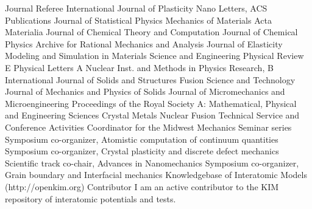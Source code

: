 \documentclass[numbers]{cv}
\begin{document}
\begin{service}
     \serviceitem
        {Journal Referee}
        {
          \eventitem{} {International Journal of Plasticity } {}
          \eventitem{} {Nano Letters, ACS Publications } {}
          \eventitem{} {Journal of Statistical Physics } {}
          \eventitem{} {Mechanics of Materials } {}
          \eventitem{} {Acta Materialia } {}
          \eventitem{} {Journal of Chemical Theory and Computation } {}
          \eventitem{} {Journal of Chemical Physics } {}
          \eventitem{} {Archive for Rational Mechanics and Analysis } {}
          \eventitem{} {Journal of Elasticity } {}
          \eventitem{} {Modeling and Simulation in Materials Science and Engineering }{}
          \eventitem{} {Physical Review E }{}
          \eventitem{} {Physical Letters A }{}
          \eventitem{} {Nuclear Inst. and Methods in Physics Research, B }{}
          \eventitem{} {International Journal of Solids and Structures } {}
          \eventitem{} {Fusion Science and Technology } {}
          \eventitem{} {Journal of Mechanics and Physics of Solids } {}
          \eventitem{} {Journal of Micromechanics and Microengineering} {}
          \eventitem{} {Proceedings of the Royal Society A: Mathematical, Physical and Engineering Sciences }{}
          \eventitem{} {Crystal } {}
          \eventitem{} {Metals } {}
          \eventitem{} {Nuclear Fusion } {}
       }
    \serviceitem
        {Technical Service and Conference Activities}
        {
             {\hspace{-0.6cm}Coordinator for the Midwest Mechanics Seminar series} {}
             {\hspace{-0.6cm}Symposium co-organizer, Atomistic computation of continuum quantities} {}
             {\hspace{-0.6cm}Symposium co-organizer, Crystal plasticity and discrete defect mechanics} {}
             {\hspace{-0.6cm}Scientific track co-chair, Advances in Nanomechanics}{}
             {\hspace{-0.6cm}Symposium co-organizer, Grain boundary and Interfacial mechanics}{}
        }
    \serviceitem
        {Knowledgebase of Interatomic Models (http://openkim.org)}
        {
        {Contributor}
        {I am an active contributor to the KIM repository of
         interatomic potentials and tests.}}
\end{service}
\end{document}
